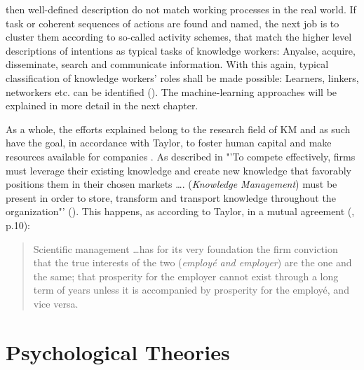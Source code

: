 then well-defined description do not match working processes in the real world. If task or coherent sequences of actions are found and named, the next job is to cluster them according to so-called activity schemes, that match the higher level descriptions of intentions as typical tasks of knowledge workers: Anyalse, acquire, disseminate, search and communicate information. With this again, typical classification of knowledge workers' roles shall be made possible: Learners, linkers, networkers etc. can be identified (\cite{reinhardt2011knowledge}). The machine-learning approaches will be explained in more detail in the next chapter. 

As a whole, the efforts explained belong to the research field of \ac{KM} and as such have the goal, in accordance with Taylor, to foster human capital and make resources available for companies . As described in \: "'To compete effectively, firms must leverage their existing knowledge and create new knowledge that favorably positions them in their chosen markets \dots. (\textit{Knowledge Management}) must be present in order to store, transform and transport knowledge throughout the organization"' (\cite{gold2001knowledge}). This happens, as according to Taylor, in a mutual agreement (\cite{taylor2013scientific}, p.10):
\begin{quotation}
Scientific management \dots has for its very foundation the firm conviction that the true interests of the two (\textit{employé and employer}) are the one and the same; that prosperity for the employer cannot exist through a long term of years unless it is accompanied by prosperity for the employé, and vice versa.
\end{quotation}

\section{Psychological Theories}
